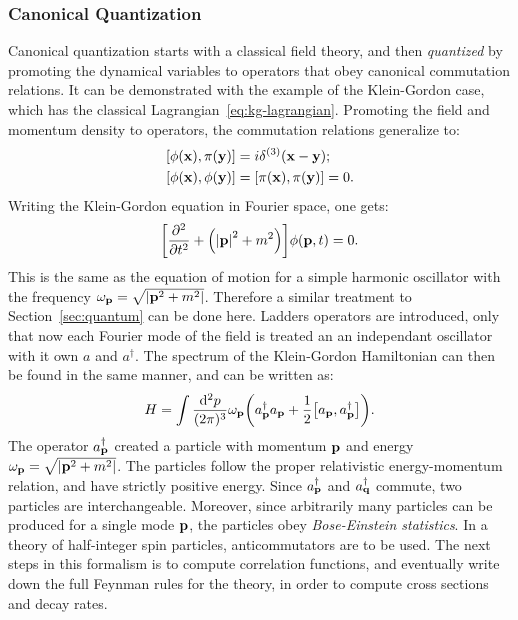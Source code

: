 \subsubsection{Canonical Quantization}
\label{sec:canonical}

Canonical quantization starts with a classical field theory, and then \emph{quantized} by promoting the dynamical variables to operators that obey canonical commutation relations. It can be demonstrated with the example of the Klein-Gordon case, which has the classical Lagrangian~\ref{eq:kg-lagrangian}. Promoting the field and momentum density to operators, the commutation relations generalize to:
\begin{equation}
\begin{split}
\comm{\phi\qty(\vb{x})}{\pi\qty(\vb{y})}&=i\delta^{(3)}\qty(\vb{x}-\vb{y});\\
\comm{\phi\qty(\vb{x})}{\phi\qty(\vb{y})}&=\comm{\pi\qty(\vb{x})}{\pi\qty(\vb{y})}=0.
\end{split}
\end{equation}
Writing the Klein-Gordon equation in Fourier space, one gets:
\begin{equation}
\qty[\pdv[2]{t} + \qty(\abs{\vb{p}}^2+m^2)]\phi(\vb{p},t)=0.
\end{equation}
This is the same as the equation of motion for a simple harmonic oscillator with the frequency $\omega_{\vb{p}}=\sqrt{\abs{\vb{p}^2+m^2}}$. Therefore a similar treatment to Section~\ref{sec:quantum} can be done here. Ladders operators are introduced, only that now each Fourier mode of the field is treated an an independant oscillator with it own $a$ and $a^\dagger$. The spectrum of the Klein-Gordon Hamiltonian can then be found in the same manner, and can be written as:
\begin{equation}
H=\int \frac{\dd^2 p}{(2\pi)^3} \omega_{\vb{p}}\qty(a^\dagger_{\vb{p}}a_{\vb{p}}+\frac{1}{2}\comm{a_{\vb{p}}}{a^\dagger_{\vb{p}}}).
\end{equation}
The operator $a^\dagger_{\vb{p}}$ created a particle with momentum $\vb{p}$ and energy $\omega_{\vb{p}}=\sqrt{\abs{\vb{p}^2+m^2}}$. The particles follow the proper relativistic energy-momentum relation, and have strictly positive energy. Since $a^\dagger_{\vb{p}}$ and $a^\dagger_{\vb{q}}$ commute, two particles are interchangeable. Moreover, since arbitrarily many particles can be produced for a single mode $\vb{p}$, the particles obey \emph{Bose-Einstein statistics}. In a theory of half-integer spin particles, anticommutators are to be used. The next steps in this formalism is to compute correlation functions, and eventually write down the full Feynman rules for the theory, in order to compute cross sections and decay rates.

